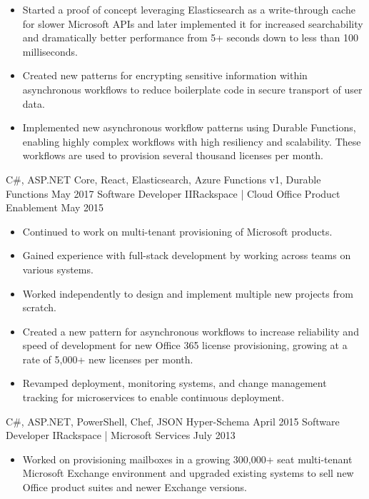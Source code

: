 \begin{experiences}
{\begin{itemize}
                        \item Started a proof of concept leveraging Elasticsearch as a write-through cache for slower Microsoft APIs and later implemented it for increased searchability and dramatically better performance from 5+ seconds down to less than 100 milliseconds.
                        \item Created new patterns for encrypting sensitive information within asynchronous workflows to reduce boilerplate code in secure transport of user data.
                        \item Implemented new asynchronous workflow patterns using Durable Functions, enabling highly complex workflows with high resiliency and scalability. These workflows are used to provision several thousand licenses per month.
                      \end{itemize}
                    }
                    {C\#, ASP.NET Core, React, Elasticsearch, Azure Functions v1, Durable Functions}
\ifcv
  \emptySeparator
  \experience
    {May 2017}     {Software Developer II}{Rackspace | Cloud Office Product Enablement}
    {May 2015}     {
                      \begin{itemize}
                        \item Continued to work on multi-tenant provisioning of Microsoft products.
                        \item Gained experience with full-stack development by working across teams on various systems.
                        \item Worked independently to design and implement multiple new projects from scratch.
                        \item Created a new pattern for asynchronous workflows to increase reliability and speed of development for new Office 365 license provisioning, growing at a rate of 5,000+ new licenses per month.
                        \item Revamped deployment, monitoring systems, and change management tracking for microservices to enable continuous deployment.
                      \end{itemize}
                    }
                    {C\#, ASP.NET, PowerShell, Chef, JSON Hyper-Schema}
\fi
  \emptySeparator
  \experience
  {April 2015}       {Software Developer I}{Rackspace | Microsoft Services}
  {July 2013}        {
                      \begin{itemize}
                        \item Worked on provisioning mailboxes in a growing 300,000+ seat multi-tenant Microsoft Exchange environment and upgraded existing systems to sell new Office product suites and newer Exchange versions.

\end{itemize}}
\end{experiences}
